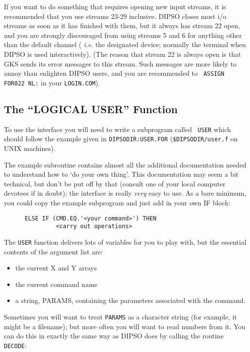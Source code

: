 If you want to do something that requires opening new input streams,
it is recommended that you use streams 23-29 inclusive. DIPSO closes
most i/o streams as soon as it has finished with them, but it always
has stream 22 open, and you are strongly discouraged from using
streams 5 and 6 for anything other than the default channel ({\em
i.e.} the designated device;  normally the terminal when DIPSO is used
interactively). (The reason that stream 22 is always open is that GKS
sends its error messages to this stream. Such messages are more likely
to annoy than enlighten DIPSO users, and you are recommended to {\tt 
ASSIGN FOR022 NL:} in your {\tt LOGIN.COM}).

\subsection {The ``LOGICAL USER'' Function}

To use the interface you will need to write a subprogram called {\tt
USER} which should follow the example given in {\tt DIPSODIR:USER.FOR}
({\tt \$DIPSODIR/user.f} on UNIX machines).

The example subroutine contains almost all the additional
documentation needed to understand how to `do your own thing'. This
documentation may seem a bit technical, but don't be put off by that
(consult one of your local computer devotees if in doubt);  the
interface is really {\em very} easy to use. As a bare minimum, you
could copy the example subprogram and just add in your own IF block:

\begin{verbatim}
      ELSE IF (CMD.EQ.'<your command>') THEN
               <carry out operations>
\end{verbatim}

The {\tt USER} function delivers lots of variables for you to play
with, but the essential contents of the argument list are:

\begin{itemize}
\item the current X and Y arrays
\item the current command name
\item a string, PARAMS, containing the parameters associated with the command.
\end{itemize}

Sometimes you will want to treat {\tt PARAMS} as a character string (for
example, it might be a filename);  but more often you will want to
read numbers from it. You can do this in exactly the same way as DIPSO
does by calling the routine {\tt DECODE}:

